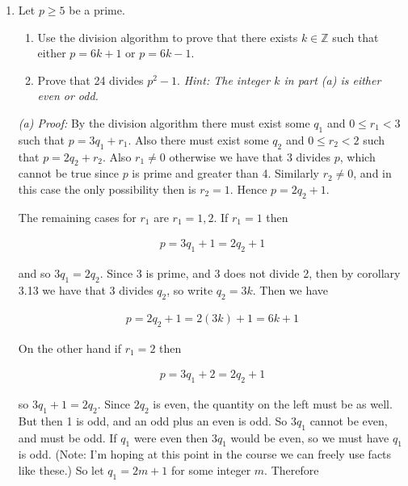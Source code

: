 \documentclass[12pt]{article}
\begin{document}
{\begin{enumerate}
This then shows that

\begin{align*}
  3181\cdot 387 = 2314\cdot 532-1
\end{align*}

which shows that 3181 divides $2314\cdot 532-1$, and so a choice for $x$ is 532.

\item Let $p\geq 5$ be a prime.
	\begin{enumerate}
	\item Use the division algorithm to prove that there exists $k \in \mathbb{Z}$ such that either $p = 6k + 1$ or $p = 6k - 1$.
	\item Prove that 24 divides $p^2 - 1$. \emph{Hint: The integer $k$ in part (a) is either even or odd.}
	\end{enumerate}

  {\it (a) Proof:} By the division algorithm there must exist some $q_1$ and $0\leq r_1<3$ such that $p=3q_1+r_1$.  Also there must exist some $q_2$ and $0\leq r_2<2$ such that $p=2q_2+r_2$. Also $r_1\ne 0$ otherwise we have that 3 divides $p$, which cannot be true since $p$ is prime and greater than 4.  Similarly $r_2\ne 0$, and in this case the only possibility then is $r_2=1$.  Hence $p=2q_2+1$.

  The remaining cases for $r_1$ are $r_1=1,2$.  If $r_1=1$ then

  \begin{align*}
    p=3q_1+1=2q_2+1
  \end{align*}

  and so $3q_1 = 2q_2$.  Since 3 is prime, and 3 does not divide 2, then by corollary 3.13 we have that 3 divides $q_2$, so write $q_2 = 3k$.  Then we have

  \begin{align*}
    p=2q_2+1=2(3k)+1 = 6k+1
  \end{align*}

  On the other hand if $r_1 = 2$ then

  \begin{align*}
    p = 3q_1+2 = 2q_2+1
  \end{align*}

  so $3q_1+1=2q_2$.  Since $2q_2$ is even, the quantity on the left must be as well.  But then 1 is odd, and an odd plus an even is odd.  So $3q_1$ cannot be even, and must be odd.  If $q_1$ were even then $3q_1$ would be even, so we must have $q_1$ is odd.  (Note: I'm hoping at this point in the course we can freely use facts like these.)  So let $q_1=2m+1$ for some integer $m$.  Therefore


\end{enumerate}}
\end{document}
